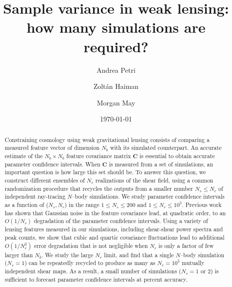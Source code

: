 \documentclass[reprint,aps,prd,superscriptaddress,showkeys,showpacs]{revtex4-1}
\newcommand{\bb}[1]{\mathbf{#1}}
\begin{document}

\title{Sample variance in weak lensing: how many simulations are required?}

\author{Andrea Petri}

\author{Zolt\'an Haiman}

\author{Morgan May}

\date{\today}

\label{firstpage}

\begin{abstract}

Constraining cosmology using weak gravitational lensing consists of
comparing a measured feature vector of dimension $N_b$ with its
simulated counterpart. An accurate estimate of the $N_b\times N_b$
feature covariance matrix $\bb{C}$ is essential to obtain accurate
parameter confidence intervals. When $\bb{C}$ is measured from a set
of simulations, an important question is how large this set should
be. To answer this question, we construct different ensembles of $N_r$
realizations of the shear field, using a common randomization
procedure that recycles the outputs from a smaller number $N_s\leq
N_r$ of independent ray-tracing $N$--body simulations.  We study
parameter confidence intervals as a function of ($N_s,N_r$) in the
range $1\leq N_s\leq 200$ and $1\leq N_r\leq 10^5$.  Previous work
\citep{DodelsonSchneider13} has shown that Gaussian noise in the
feature covariance lead, at quadratic order, to an $O(1/N_r)$
degradation of the parameter confidence intervals. Using a variety of
lensing features measured in our simulations, including shear-shear
power spectra and peak counts, we show that cubic and quartic
covariance fluctuations lead to additional $O(1/N_r^2)$ error
degradation that is not negligible when $N_r$ is only a factor of few
larger than $N_b$. We study the large $N_r$ limit, and find that a
single $N$--body simulation ($N_s=1$) can be repeatedly recycled to
produce as many as $N_r=10^5$ mutually independent shear maps. As a
result, a small number of simulations ($N_s=1$ or $2$) is sufficient
to forecast parameter confidence intervals at percent
accuracy. 



\end{abstract}
\end{document}
